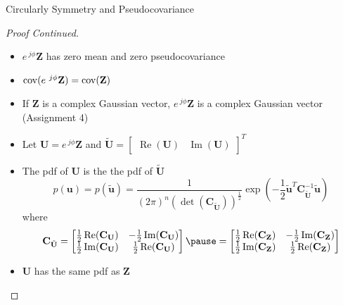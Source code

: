 \documentclass[t]{beamer}
\newcommand{\cov}{\operatornamewithlimits{cov}}
\renewcommand\Re{\operatorname{Re}}
\renewcommand\Im{\operatorname{Im}}
\begin{document}
\begin{frame}{Circularly Symmetry and Pseudocovariance}
  \footnotesize
  \begin{proof}[Proof Continued]
    \begin{itemize}
      \item \pause $e^{\ j\phi}\mathbf{Z}$ has zero mean \pause and zero pseudocovariance
      \item \pause $\cov(e^{\ j\phi}\mathbf{Z}) = \cov(\mathbf{Z})$
      \item \pause If $\mathbf{Z}$ is a complex Gaussian vector, $e^{\ j\phi}\mathbf{Z}$ is a complex Gaussian vector \pause (\alert{Assignment 4})
      \item \pause Let $\mathbf{U} = e^{\ j\phi}\mathbf{Z}$ \pause and $\tilde{\mathbf{U}} = \begin{bmatrix} \Re(\mathbf{U}) & \Im(\mathbf{U}) \end{bmatrix}^T$
      \item \pause The pdf of $\mathbf{U}$ is the the pdf of $\tilde{\mathbf{U}}$
        \begin{equation*}
          p(\mathbf{u}) = p(\tilde{\mathbf{u}}) = \frac{1}{(2\pi)^n(\det(\mathbf{C}_{\tilde{\mathbf{U}}}))^{\frac{1}{2}}} \exp\left(-\frac{1}{2} \tilde{\mathbf{u}}^T\mathbf{C}_{\tilde{\mathbf{U}}}^{-1}\tilde{\mathbf{u}}\right)
        \end{equation*}
        \pause where
      \begin{equation*}
        \mathbf{C}_{\tilde{\mathbf{U}}} = \begin{bmatrix} \frac{1}{2}\Re(\mathbf{C_U}) & -\frac{1}{2}\Im(\mathbf{C_U}) \\ \frac{1}{2}\Im(\mathbf{C_U}) & \frac{1}{2}\Re(\mathbf{C_U}) \end{bmatrix} \pause = \begin{bmatrix} \frac{1}{2}\Re(\mathbf{C_Z}) & -\frac{1}{2}\Im(\mathbf{C_Z}) \\ \frac{1}{2}\Im(\mathbf{C_Z}) & \frac{1}{2}\Re(\mathbf{C_Z}) \end{bmatrix}
      \end{equation*}
      \item \pause $\mathbf{U}$ has the same pdf as $\mathbf{Z}$
    \end{itemize}
  \end{proof}
  \normalsize
\end{frame}
\end{document}
